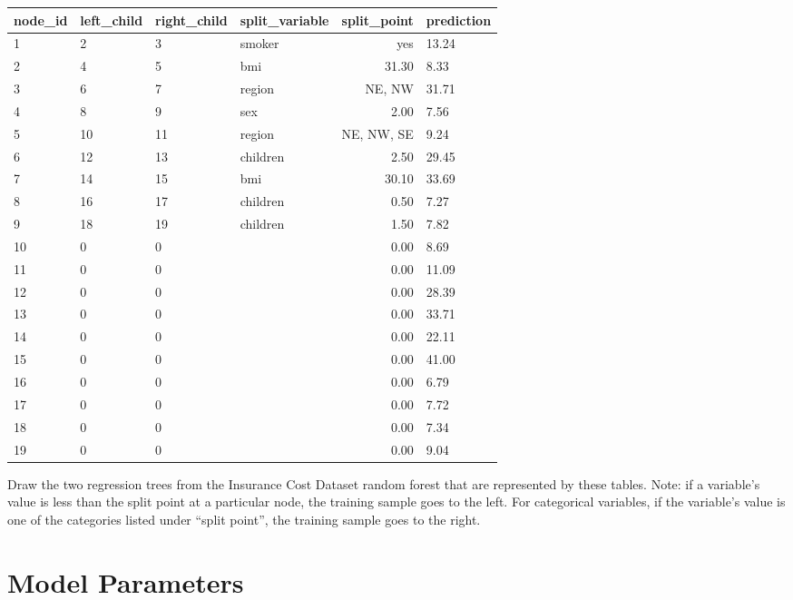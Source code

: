 \begin{center}
{\begin{tabular}{llllrl}
  \hline
 node\_id & left\_child & right\_child & split\_variable & split\_point & prediction \\ 
  \hline
  1 & 2 & 3 & smoker & yes & 13.24 \\ 
  2 & 4 & 5 & bmi & 31.30 & 8.33 \\ 
  3 & 6 & 7 & region & NE, NW & 31.71 \\ 
  4 & 8 & 9 & sex & 2.00 & 7.56 \\ 
  5 & 10 & 11 & region & NE, NW, SE & 9.24 \\ 
  6 & 12 & 13 & children & 2.50 & 29.45 \\ 
  7 & 14 & 15 & bmi & 30.10 & 33.69 \\ 
  8 & 16 & 17 & children & 0.50 & 7.27 \\ 
  9 & 18 & 19 & children & 1.50 & 7.82 \\ 
  10 & 0 & 0 &  & 0.00 & 8.69 \\ 
  11 & 0 & 0 &  & 0.00 & 11.09 \\ 
  12 & 0 & 0 &  & 0.00 & 28.39 \\ 
  13 & 0 & 0 &  & 0.00 & 33.71 \\ 
  14 & 0 & 0 &  & 0.00 & 22.11 \\ 
  15 & 0 & 0 &  & 0.00 & 41.00 \\ 
  16 & 0 & 0 &  & 0.00 & 6.79 \\ 
  17 & 0 & 0 &  & 0.00 & 7.72 \\ 
  18 & 0 & 0 &  & 0.00 & 7.34 \\ 
  19 & 0 & 0 &  & 0.00 & 9.04 \\ 
   \hline
\end{tabular}
}
\end{center}

\vspace{3mm}

\begin{question}{}
Draw the two regression trees from the Insurance Cost Dataset random forest that are represented by these tables. Note: if a variable's value is less than the split point at a particular node, the training sample goes to the left. For categorical variables, if the variable's value is one of the categories listed under ``split point'', the training sample goes to the right. 
\end{question}


\section{Model Parameters}


